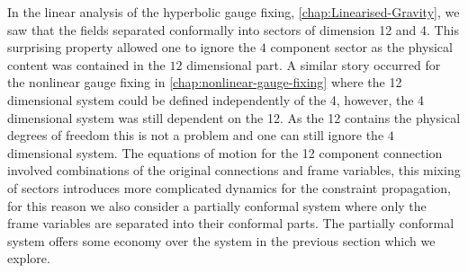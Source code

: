 \documentclass[10pt]{report}
\theoremstyle{definition}
\begin{document}
    In the linear analysis of the hyperbolic gauge fixing, \cref{chap:Linearised-Gravity}, we saw that the fields separated conformally into sectors of dimension 12 and 4. This surprising property allowed one to ignore the $4$ component sector as the physical content was contained in the $12$ dimensional part. A similar story occurred for the nonlinear gauge fixing in \cref{chap:nonlinear-gauge-fixing} where the 12 dimensional system could be defined independently of the 4, however, the 4 dimensional system was still dependent on the 12. As the 12 contains the physical degrees of freedom this is not a problem and one can still ignore the $4$ dimensional system. The equations of motion for the 12 component connection involved combinations of the original connections and frame variables, this mixing of sectors introduces more complicated dynamics for the constraint propagation, for this reason we also consider a partially conformal system where only the frame variables are separated into their conformal parts. The partially conformal system offers some economy over the system in the previous section which we explore.
\end{document}
